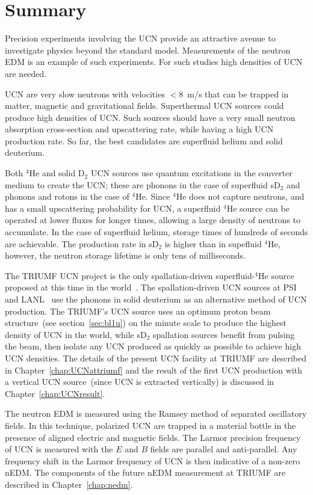 \section{Summary}
Precision experiments involving the UCN provide an attractive avenue
to investigate physics beyond the standard model. Measurements of the
neutron EDM is an example of such experiments. For such studies high
densities of UCN are needed.

UCN are very slow neutrons with velocities $<8$~m/s that can be
trapped in matter, magnetic and gravitational fields.  Superthermal
UCN sources could produce high densities of UCN. Such sources should
have a very small neutron absorption cross-section and upscattering
rate, while having a high UCN production rate. So far, the best
candidates are superfluid helium and solid deuterium.

Both $^4$He and solid D$_2$ UCN sources use quantum excitations in the
converter medium to create the UCN; these are phonons in the case of
superfluid sD$_2$ and phonons and rotons in the case of $^4$He. Since
$^4$He does not capture neutrons, and has a small upscattering
probability for UCN, a superfluid $^4$He source can be operated at
lower fluxes for longer times, allowing a large density of neutrons to
accumulate. In the case of superfluid helium, storage times of
hundreds of seconds are achievable. The production rate in sD$_2$ is
higher than in supefluid $^4$He, however, the neutron storage lifetime
is only tens of milliseconds.

The TRIUMF UCN project is the only spallation-driven superfluid-$^4$He
source proposed at this time in the world~\cite{Ruediger}. The
spallation-driven UCN sources at PSI~\cite{Ries_ascona} and
LANL~\cite{Ito_ascona} use the phonons in solid deuterium as an
alternative method of UCN production.
The TRIUMF's UCN source uses an optimum proton beam structure~(see
section~\ref{sec:bl1u}) on the minute scale to produce the highest
density of UCN in the world, while sD$_2$ spallation sources benefit
from pulsing the beam, then isolate any UCN produced as quickly as
possible to achieve high UCN densities.  The details of the present
UCN facility at TRIUMF are described in Chapter~\ref{chap:UCNattriumf}
and the result of the first UCN production with a vertical UCN
source~(since UCN is extracted vertically) is discussed in
Chapter~\ref{chap:UCNresult}.

The neutron EDM is measured using the Ramsey method of separated
oscillatory fields. In this technique, polarized UCN are trapped in a
material bottle in the presence of aligned electric and magnetic
fields. The Larmor precision frequency of UCN is measured with the $E$
and $B$ fields are parallel and anti-parallel. Any frequency shift in
the Larmor frequency of UCN is then indicative of a non-zero nEDM. The
components of the future nEDM measurement at TRIUMF are described in
Chapter~\ref{chap:nedm}.
